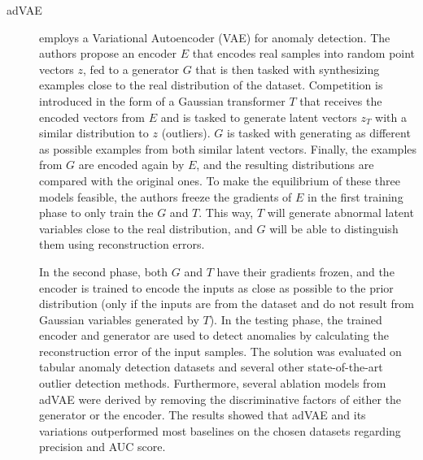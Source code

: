 \begin{description}
    \item[adVAE \cite{wang.etal_AdVAESelfadversarialVariational_2020}] employs a Variational Autoencoder (VAE) for anomaly detection. The authors propose an encoder $E$ that encodes real samples into random point vectors $z$, fed to a generator $G$ that is then tasked with synthesizing examples close to the real distribution of the dataset. Competition is introduced in the form of a Gaussian transformer $T$ that receives the encoded vectors from $E$ and is tasked to generate latent vectors $z_T$ with a similar distribution to $z$ (outliers). $G$ is tasked with generating as different as possible examples from both similar latent vectors. Finally, the examples from $G$ are encoded again by $E$, and the resulting distributions are compared with the original ones. To make the equilibrium of these three models feasible, the authors freeze the gradients of $E$ in the first training phase to only train the $G$ and $T$. This way, $T$ will generate abnormal latent variables close to the real distribution, and $G$ will be able to distinguish them using reconstruction errors. 
    
    In the second phase, both $G$ and $T$ have their gradients frozen, and the encoder is trained to encode the inputs as close as possible to the prior distribution (only if the inputs are from the dataset and do not result from Gaussian variables generated by $T$). In the testing phase, the trained encoder and generator are used to detect anomalies by calculating the reconstruction error of the input samples. The solution was evaluated on tabular anomaly detection datasets and several other state-of-the-art outlier detection methods. Furthermore, several ablation models from adVAE were derived by removing the discriminative factors of either the generator or the encoder. The results showed that adVAE and its variations outperformed most baselines on the chosen datasets regarding precision and AUC score. 
\end{description}

